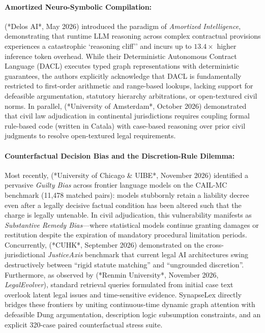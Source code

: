 \documentclass[11pt,a4paper]{article}
\begin{document}
\paragraph{Amortized Neuro-Symbolic Compilation:} \citet{sojka2026accurate} (*Delos AI*, May 2026) introduced the paradigm of \textit{Amortized Intelligence}, demonstrating that runtime LLM reasoning across complex contractual provisions experiences a catastrophic `reasoning cliff'' and incurs up to $13.4\times$ higher inference token overhead. While their Deterministic Autonomous Contract Language (DACL) executes typed graph representations with deterministic guarantees, the authors explicitly acknowledge that DACL is fundamentally restricted to first-order arithmetic and range-based lookups, lacking support for defeasible argumentation, statutory hierarchy arbitrations, or open-textured civil norms. In parallel, \citet{boven2026machina} (*University of Amsterdam*, October 2026) demonstrated that civil law adjudication in continental jurisdictions requires coupling formal rule-based code (written in Catala) with case-based reasoning over prior civil judgments to resolve open-textured legal requirements.

\paragraph{Counterfactual Decision Bias and the Discretion-Rule Dilemma:} Most recently, \citet{wang2026prose} (*University of Chicago \& UIBE*, November 2026) identified a pervasive \textit{Guilty Bias} across frontier language models on the CAIL-MC benchmark (11,478 matched pairs): models stubbornly retain a liability decree even after a legally decisive factual condition has been altered such that the charge is legally untenable. In civil adjudication, this vulnerability manifests as \textit{Substantive Remedy Bias}---where statistical models continue granting damages or restitution despite the expiration of mandatory procedural limitation periods. Concurrently, \citet{tu2026justiceaxis} (*CUHK*, September 2026) demonstrated on the cross-jurisdictional \textit{JusticeAxis} benchmark that current legal AI architectures swing destructively between ``rigid statute matching'' and ``ungrounded discretion''. Furthermore, as observed by \citet{yang2026legalevolver} (*Renmin University*, November 2026, \textit{LegalEvolver}), standard retrieval queries formulated from initial case text overlook latent legal issues and time-sensitive evidence. SynapseLex directly bridges these frontiers by uniting continuous-time dynamic graph attention with defeasible Dung argumentation, description logic subsumption constraints, and an explicit 320-case paired counterfactual stress suite.
\end{document}
